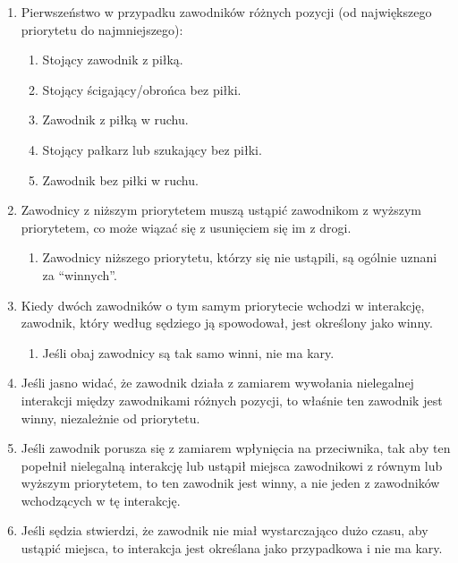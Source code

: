 \documentclass[11pt,a4paper]{article}
\begin{document}
\begin{enumerate}

\item
  Pierwszeństwo w przypadku zawodników różnych pozycji (od największego
  priorytetu do najmniejszego):

  \begin{enumerate}
  
  \item
    Stojący zawodnik z piłką.
  \item
    Stojący ścigający/obrońca bez piłki.
  \item
    Zawodnik z piłką w ruchu.
  \item
    Stojący pałkarz lub szukający bez piłki.
  \item
    Zawodnik bez piłki w ruchu.
  \end{enumerate}
\item
  Zawodnicy z niższym priorytetem muszą ustąpić zawodnikom z wyższym
  priorytetem, co może wiązać się z usunięciem się im z drogi.

  \begin{enumerate}
  
  \item
    Zawodnicy niższego priorytetu, którzy się nie ustąpili, są ogólnie
    uznani za ``winnych''.
  \end{enumerate}
\item
  Kiedy dwóch zawodników o tym samym priorytecie wchodzi w interakcję,
  zawodnik, który według sędziego ją spowodował, jest określony jako
  winny.

  \begin{enumerate}
  
  \item
    Jeśli obaj zawodnicy są tak samo winni, nie ma kary.
  \end{enumerate}
\item
  Jeśli jasno widać, że zawodnik działa z zamiarem wywołania nielegalnej
  interakcji między zawodnikami różnych pozycji, to właśnie ten zawodnik
  jest winny, niezależnie od priorytetu.
\item
  Jeśli zawodnik porusza się z zamiarem wpłynięcia na przeciwnika, tak
  aby ten popełnił nielegalną interakcję lub ustąpił miejsca zawodnikowi
  z równym lub wyższym priorytetem, to ten zawodnik jest winny, a nie
  jeden z zawodników wchodzących w tę interakcję.
\item
  Jeśli sędzia stwierdzi, że zawodnik nie miał wystarczająco dużo czasu,
  aby ustąpić miejsca, to interakcja jest określana jako przypadkowa i
  nie ma kary.


\end{enumerate}
\end{document}
